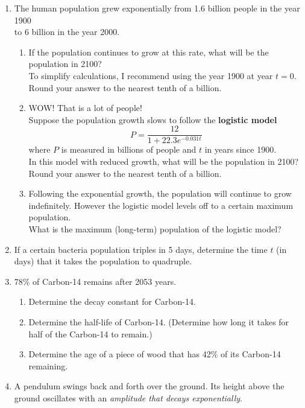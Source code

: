\begin{enumerate}
\clearpage

\item The human population grew exponentially from 1.6 billion people in the year 1900 \\ to 6 billion in the year 2000.
\begin{enumerate}
\item If the population continues to grow at this rate, what will be the population in 2100? \\ To simplify calculations, I recommend using the year 1900 at year $t=0$.  Round your answer to the nearest tenth of a billion. \vfill \vfill
\item WOW! That is a lot of people!  \\ Suppose the population growth slows to follow the \textbf{logistic model} $$P=\dfrac{12}{1+22.3e^{-0.031t}}$$  where $P$ is measured in billions of people and $t$ in years since 1900. \\ In this model with reduced growth, what will be the population in 2100?  Round your answer to the nearest tenth of a billion. \vfill
\item Following the exponential growth, the population will continue to grow indefinitely.  However the logistic model levels off to a certain maximum population.  \\ What is the maximum (long-term) population of the logistic model? \vfill
\end{enumerate} 



\clearpage
\item If a certain bacteria population triples in 5 days, determine the time $t$ (in days) that it takes the population to quadruple.\vfill



\item 78\% of Carbon-14 remains after 2053 years.
\begin{enumerate}
\item Determine the decay constant for Carbon-14.\vfill
\item Determine the half-life of Carbon-14. (Determine how long it takes for half of the Carbon-14 to remain.)\vfill
\item Determine the age of a piece of wood that has 42\% of its Carbon-14 remaining.\vfill
\end{enumerate}


\clearpage
\item A pendulum swings back and forth over the ground. Its height above the ground oscillates with an \emph{amplitude that decays exponentially}.


\end{enumerate}
